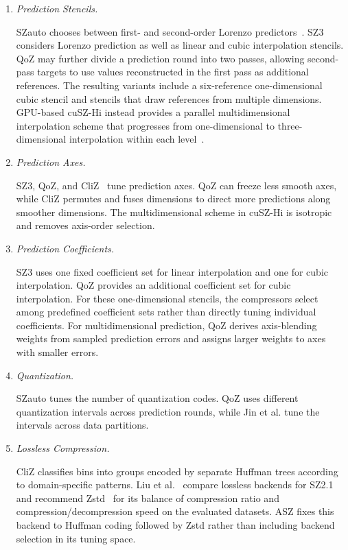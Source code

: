 \begin{enumerate}
\item \emph{Prediction Stencils.}\par\noindent\mbox{\hspace{1em}}SZauto chooses between first- and second-order Lorenzo predictors~\cite{zhao2020significantly}. SZ3 considers Lorenzo prediction as well as linear and cubic interpolation stencils. QoZ may further divide a prediction round into two passes, allowing second-pass targets to use values reconstructed in the first pass as additional references. The resulting variants include a six-reference one-dimensional cubic stencil and stencils that draw references from multiple dimensions. GPU-based cuSZ-Hi instead provides a parallel multidimensional interpolation scheme that progresses from one-dimensional to three-dimensional interpolation within each level~\cite{wu2025boosting}.

\item \emph{Prediction Axes.}\par\noindent\mbox{\hspace{1em}}SZ3, QoZ, and CliZ~\cite{jian2024cliz} tune prediction axes. QoZ can freeze less smooth axes, while CliZ permutes and fuses dimensions to direct more predictions along smoother dimensions. The multidimensional scheme in cuSZ-Hi is isotropic and removes axis-order selection.

\item \emph{Prediction Coefficients.}\par\noindent\mbox{\hspace{1em}}SZ3 uses one fixed coefficient set for linear interpolation and one for cubic interpolation. QoZ provides an additional coefficient set for cubic interpolation. For these one-dimensional stencils, the compressors select among predefined coefficient sets rather than directly tuning individual coefficients. For multidimensional prediction, QoZ derives axis-blending weights from sampled prediction errors and assigns larger weights to axes with smaller errors.

\item \emph{Quantization.}\par\noindent\mbox{\hspace{1em}}SZauto tunes the number of quantization codes. QoZ uses different quantization intervals across prediction rounds, while Jin et al. tune the intervals across data partitions.

\item \emph{Lossless Compression.}\par\noindent\mbox{\hspace{1em}}CliZ classifies bins into groups encoded by separate Huffman trees according to domain-specific patterns. Liu et al.~\cite{liu2021improving} compare lossless backends for SZ2.1 and recommend Zstd~\cite{ycollet2021zstd} for its balance of compression ratio and compression/decompression speed on the evaluated datasets. ASZ fixes this backend to Huffman coding followed by Zstd rather than including backend selection in its tuning space.


\end{enumerate}
